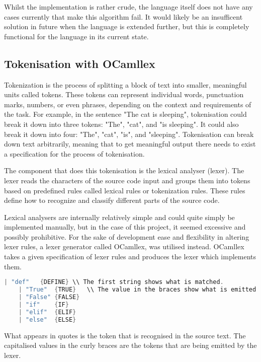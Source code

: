 \documentclass{l4proj}
\begin{document}
Whilst the implementation is rather crude, the language itself does not have any cases currently that make this algorithm fail.
It would likely be an insufficent solution in future when the language is extended further, but this is completely functional for the language in its current state.


\subsection{Tokenisation with OCamllex}

Tokenization is the process of splitting a block of text into smaller, meaningful units called tokens.
These tokens can represent individual words, punctuation marks, numbers, or even phrases, depending on the context and requirements of the task.
For example, in the sentence "The cat is sleeping", tokenisation could break it down into three tokens: "The", "cat", and "is sleeping".
It could also break it down into four: "The", "cat", "is", and "sleeping".
Tokenisation can break down text arbitrarily, meaning that to get meaningful output there needs to exist a specification for the process of tokenisation.

The component that does this tokenisation is the lexical analyser (lexer).
The lexer reads the characters of the source code input and groups them into tokens based on predefined rules called lexical rules or tokenization rules.
These rules define how to recognize and classify different parts of the source code.

Lexical analysers are internally relatively simple and could quite simply be implemented manually, but in the case of this project, it seemed excessive and possibly prohibitive.
For the sake of development ease and flexibility in altering lexer rules, a lexer generator called OCamllex, was utilised instead.
OCamllex takes a given specification of lexer rules and produces the lexer which implements them.


\begin{lstlisting}[language=C, keepspaces=true, caption=A small extract of the PyFunc lexer\, showing the syntax of the lexer specification.]
    | "def"   {DEFINE} \\ The first string shows what is matched.
    | "True"  {TRUE}   \\ The value in the braces show what is emitted.
    | "False" {FALSE}
    | "if"    {IF}
    | "elif"  {ELIF}
    | "else"  {ELSE}
\end{lstlisting}
What appears in quotes is the token that is recognised in the source text.
The capitalised values in the curly braces are the tokens that are being emitted by the lexer.
\end{document}
